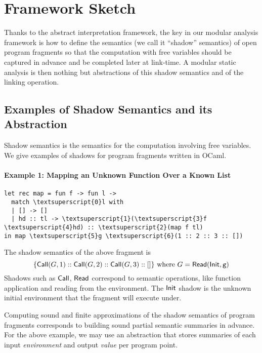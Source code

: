\documentclass{article}
\begin{document}
\section{Framework Sketch}
Thanks to the abstract interpretation framework, the key in our
modular analysis framework is how to define the semantics (we call it
``shadow'' semantics) of open program fragments so that the
computation with free variables should be captured in advance
and be completed later at link-time. A modular static analysis is
then nothing but abstractions of this shadow semantics and of the
linking operation.

\subsection{Examples of Shadow Semantics and its Abstraction}
Shadow semantics is the semantics for the computation involving
free variables. We give examples of shadows for program fragments
written in OCaml.

\paragraph{Example 1: Mapping an Unknown Function Over a Known List}
\begin{center}
  \begin{BVerbatim}[commandchars=\\\{\}]
let rec map = fun f -> fun l ->
  match \textsuperscript{0}l with
  | [] -> []
  | hd :: tl -> \textsuperscript{1}(\textsuperscript{3}f \textsuperscript{4}hd) :: \textsuperscript{2}(map f tl)
in map \textsuperscript{5}g \textsuperscript{6}(1 :: 2 :: 3 :: [])
  \end{BVerbatim}
\end{center}
The shadow semantics of the above fragment is
\[
  \{\mathsf{Call}({G},1)::\mathsf{Call}({G},2)::\mathsf{Call}({G},3)::[]\}
  \text{ where }
  {G}=\mathsf{Read}(\mathsf{Init},\texttt{g})
\]
Shadows such as $\mathsf{Call}$, $\mathsf{Read}$ correspond to semantic operations,
like function application and reading from the environment.
The $\mathsf{Init}$ shadow is the unknown initial environment that the fragment will execute under.

Computing sound and finite approximations of the shadow
semantics of program fragments corresponds to building sound partial
semantic summaries in advance. For the above example,
we may use an abstraction that stores summaries of each input \emph{environment}
and output \emph{value} per program point.
\end{document}
